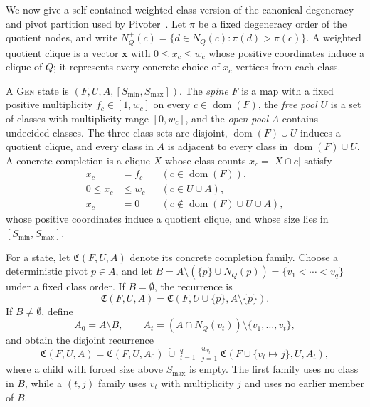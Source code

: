 We now give a self-contained weighted-class version of the canonical degeneracy and pivot partition used by Pivoter~\cite{Pivoter}.
%
Let $\pi$ be a fixed degeneracy order of the quotient nodes, and write $N_Q^+(c)=\{d\in N_Q(c):\pi(d)>\pi(c)\}$.
%
A weighted quotient clique is a vector $\mathbf x$ with $0\leq x_c\leq w_c$ whose positive coordinates induce a clique of $Q$; it represents every concrete choice of $x_c$ vertices from each class.

\begin{definition}
\label{def:gen-state}
A \textsc{Gen} state is $(F,U,A,[S_{\min},S_{\max}])$.
%
The \emph{spine} $F$ is a map with a fixed positive multiplicity $f_c\in[1,w_c]$ on every $c\in\operatorname{dom}(F)$, the \emph{free pool} $U$ is a set of classes with multiplicity range $[0,w_c]$, and the \emph{open pool} $A$ contains undecided classes.
%
The three class sets are disjoint, $\operatorname{dom}(F)\cup U$ induces a quotient clique, and every class in $A$ is adjacent to every class in $\operatorname{dom}(F)\cup U$.
%
A concrete completion is a clique $X$ whose class counts $x_c=|X\cap c|$ satisfy
\[
\begin{aligned}
x_c&=f_c &&(c\in\operatorname{dom}(F)),\\
0\leq x_c&\leq w_c &&(c\in U\cup A),\\
x_c&=0 &&(c\notin\operatorname{dom}(F)\cup U\cup A),
\end{aligned}
\]
whose positive coordinates induce a quotient clique, and whose size lies in $[S_{\min},S_{\max}]$.
\end{definition}

For a state, let $\mathfrak C(F,U,A)$ denote its concrete completion family.
%
Choose a deterministic pivot $p\in A$, and let $B=A\setminus(\{p\}\cup N_Q(p))=\{v_1<\cdots<v_q\}$ under a fixed class order.
%
If $B=\emptyset$, the recurrence is
\begin{equation}
\label{eq:gen-universal-recurrence}
\mathfrak C(F,U,A)
=
\mathfrak C(F,U\cup\{p\},A\setminus\{p\}).
\end{equation}
If $B\neq\emptyset$, define
\[
A_0=A\setminus B,
\qquad
A_t=(A\cap N_Q(v_t))\setminus\{v_1,\ldots,v_t\},
\]
and obtain the disjoint recurrence
\begin{equation}
\label{eq:gen-nonuniversal-recurrence}
\mathfrak C(F,U,A)
=
\mathfrak C(F,U,A_0)
\ \dot\cup\!
\mathop{\dot\bigcup}_{t=1}^{q}
\mathop{\dot\bigcup}_{j=1}^{w_{v_t}}
\mathfrak C(F\cup\{v_t\mapsto j\},U,A_t),
\end{equation}
where a child with forced size above $S_{\max}$ is empty.
%
The first family uses no class in $B$, while a $(t,j)$ family uses $v_t$ with multiplicity $j$ and uses no earlier member of $B$.


